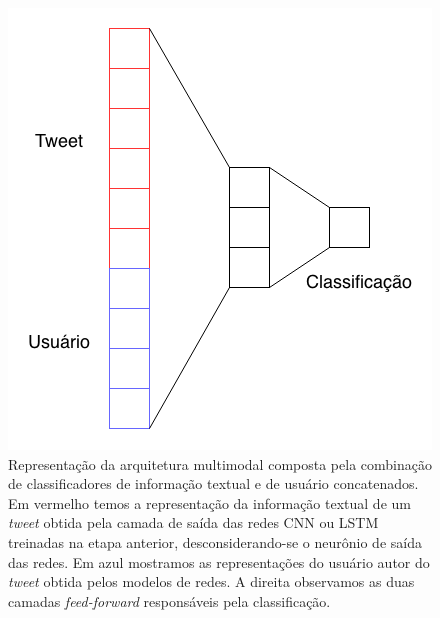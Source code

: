 \begin{figure}[h]
\begin{center} {
    \begin{center}
    \includegraphics[scale=0.45]{images/network_composition.png}
    \caption{Representação da arquitetura multimodal composta pela combinação de
        classificadores de informação textual e de usuário concatenados.
        Em vermelho temos a representação da informação textual de um \textit{tweet}
        obtida pela camada de saída das redes CNN ou LSTM treinadas na etapa anterior,
        desconsiderando-se o neurônio de saída das redes.
        Em azul mostramos as representações do usuário autor do \textit{tweet} obtida
        pelos modelos de redes.
        A direita observamos as duas camadas \textit{feed-forward} responsáveis pela
        classificação.}
    \label{fig:network_composition}
    \end{center}
}
\end{center}
\end{figure}
